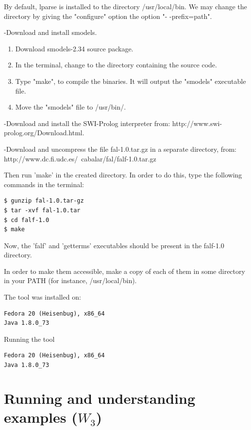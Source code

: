 \documentclass[a4paper,12pt]{report}
\begin{document}
  By default, lparse is installed to the directory /usr/local/bin. We may change the directory by giving the "configure" option the option "- -prefix=path".

  -Download and install smodels.
\begin{enumerate}
 \item Download smodels-2.34 source package.
 \item In the terminal, change to the directory containing the source code.
 \item Type "make", to compile the binaries. It will output the "smodels" executable file.
 \item Move the "smodels" file to /usr/bin/.
\end{enumerate}

  -Download and install the SWI-Prolog interpreter from: http://www.swi-prolog.org/Download.html.

  
  -Download and uncompress the file fal-1.0.tar.gz in a separate directory, from: http://www.dc.fi.udc.es/~cabalar/fal/falf-1.0.tar.gz

  Then run 'make' in the created directory.
  In order to do this, type the following commands in the terminal:
\begin{verbatim}
$ gunzip fal-1.0.tar-gz
$ tar -xvf fal-1.0.tar
$ cd falf-1.0
$ make
\end{verbatim}

Now, the 'falf' and 'getterms' executables should be present in the falf-1.0 directory.

In order to make them accessible, make a copy of each of them in some directory in your PATH (for instance, /usr/local/bin).

 
 
The tool was installed on:
\begin{verbatim}
Fedora 20 (Heisenbug), x86_64
Java 1.8.0_73

\end{verbatim}

Running the tool
\begin{verbatim}
Fedora 20 (Heisenbug), x86_64
Java 1.8.0_73

\end{verbatim}



\chapter{Running and understanding examples ($W_3$)}
\end{document}
